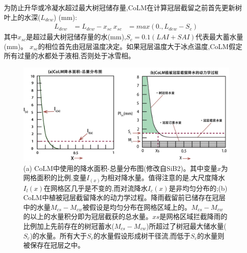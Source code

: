 为防止升华或冷凝水超过最大树冠储存量,CoLM在计算冠层截留之前首先更新树叶上的水深($L_{dew}$) (mm):
\begin{equation}
\begin{aligned}
L_{dew} &= L_{dew}-x_{sc} \
x_{s c} &= max \left(0., L_{dew}-S_{c}\right)
\end{aligned}
\end{equation}
其中$x_{sc}$是超过最大树冠储存量的水(mm),$S_c=0.1\left(LAI+SAI\right)$代表最大蓄水量(mm)。
$x_{sc}$的相位首先由冠层温度决定。如果冠层温度大于冰点温度,CoLM假定所有过量的水都处于液相,否则处于冰雪相。

\begin{figure}[htbp]
\centering
\includegraphics[scale=0.75]{Figures/植被冠层和土壤水分/CoLM冠层截留示意图.png}
\caption{(a) CoLM中使用的降水面积-总量分布图(修改自SiB2)。其中变量$x$为网格面积的比例,变量$I_{\left(x\right)}$为相对降水量。值得注意的是,大尺度降水$I_l\left(x\right)$在网格区几乎是不变的,而对流降水$I_c\left(x\right)$是非均匀分布的;(b) CoLM中植被冠层截留降水的动力学过程。降雨截留前已储存在冠层中的水量$M_{cs}-M_{cw}$被假设是均匀分布在网格区域上的。$M_{cs}-M_{cw}$的以上的水量积分即为冠层截获的总水量。$xs$是网格区域拦截降雨的比例加上先前存在的树冠蓄水($M_{cs}-M_{cw}$)所超过了树冠最大储水量($S_c$)的水量。所有大于$S_c$的水量假设形成树干径流,而低于$S_c$的水量则被保存在冠层之中。}
\label{fig:CoLM冠层截留示意图}
\end{figure}

